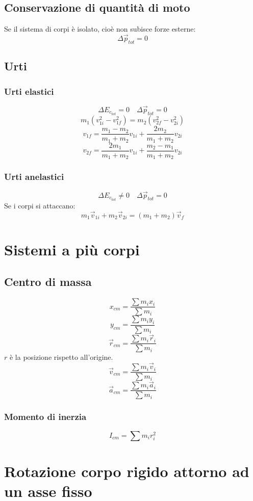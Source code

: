 \documentclass[a4paper]{article}
\theoremstyle{break}
\theoremstyle{break}
\theoremstyle{break}
\theoremstyle{break}
\begin{document}
\subsection{Conservazione di quantità di moto}
Se il sistema di corpi è isolato, cioè non subisce forze esterne:
\[
  \Delta \vec{p}_{tot} = 0
\]

\subsection{Urti}
\subsubsection{Urti elastici}
\[
  \Delta E_{c_{tot}} = 0 \quad \Delta \vec{p}_{tot} = 0
\] 
\[
  m_1 \left( v_{1i}^2 - v_{1f}^2 \right) = m_2 \left( v_{2f}^2 - v_{2i}^2 \right)
\] 
\[
  v_{1f} = \frac{m_1 - m_2}{m_1 + m_2} v_{1i} + \frac{2 m_2}{m_1 + m_2} v_{2i}
\] 
\[
  v_{2f} = \frac{2 m_1}{m_1 + m_2} v_{1i} + \frac{m_2 - m_1}{m_1 + m_2} v_{2i}
\] 
\subsubsection{Urti anelastici}
\[
  \Delta E_{c_{tot}} \neq 0 \quad \Delta \vec{p}_{tot} = 0
\]
Se i corpi si attaccano:
\[
  m_1 \vec{v}_{1i} + m_2 \vec{v}_{2i} = (m_1 + m_2) \vec{v}_f
\] 

\section{Sistemi a più corpi}
\subsection{Centro di massa}
\[
  x_{cm} = \frac{\sum m_i x_i}{\sum m_i}
\]
\[
  y_{cm} = \frac{\sum m_i y_i}{\sum m_i}
\]
\vspace{1em}
\[
  \vec{r}_{cm} = \frac{\sum m_i \vec{r}_i}{\sum m_i}
\] 
\( r \) è la posizione rispetto all'origine. 
\[
  \vec{v}_{cm} = \frac{\sum m_i \vec{v}_i}{\sum m_i}
\] 
\[
  \vec{a}_{cm} = \frac{\sum m_i \vec{a}_i}{\sum m_i}
\]
\subsubsection{Momento di inerzia}
\[
  I_{cm} = \sum m_i r_i^2
\]

\section{Rotazione corpo rigido attorno ad un asse fisso}
\end{document}
